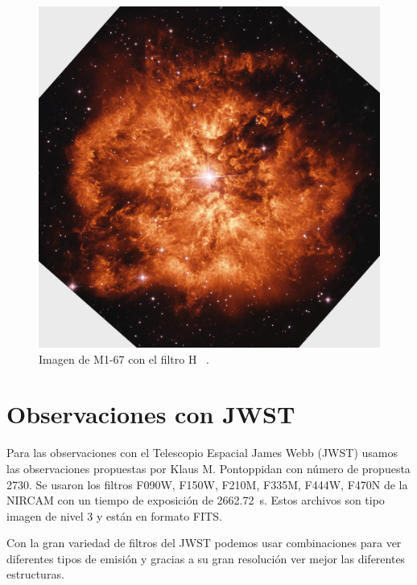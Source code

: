 \documentclass{book}
\begin{document}
\begin{figure}[htb]
    \centering
    \includegraphics[width=\textwidth]{m1-67-comp-full-hst.jpg}
    \caption{Imagen de M1-67 con el filtro \unit{H\alpha} .}
    \label{fig:M1-67HST}
\end{figure}

\section{Observaciones con JWST}

Para las observaciones con el Telescopio Espacial James Webb (JWST) usamos las observaciones propuestas por Klaus M. Pontoppidan con número de propuesta 2730. Se usaron los filtros F090W, F150W, F210M, F335M, F444W, F470N de la NIRCAM con un tiempo de exposición de \SI{2662.72}{s}. Estos archivos son tipo imagen de nivel 3 y están en formato FITS.

Con la gran variedad de filtros del JWST podemos usar combinaciones para ver diferentes tipos de emisión y gracias a su gran resolución ver mejor las diferentes estructuras.
\end{document}
